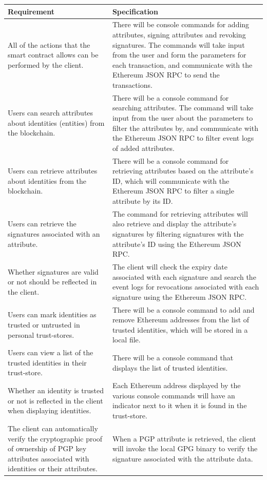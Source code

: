 \documentclass[a4paper]{report}
\begin{document}
	\noindent \begin{longtable}{|p{5.5cm}|p{5.5cm}|}
		\hline
		\textbf{Requirement} & \textbf{Specification} \\ \hline
		All of the actions that the smart contract allows can be performed by the client. & There will be console commands for adding attributes, signing attributes and revoking signatures. The commands will take input from the user and form the parameters for each transaction, and communicate with the Ethereum JSON RPC to send the transactions. \\ \hline
		Users can search attributes about identities (entities) from the blockchain. & There will be a console command for searching attributes. The command will take input from the user about the parameters to filter the attributes by, and communicate with the Ethereum JSON RPC to filter event logs of added attributes. \\ \hline
		Users can retrieve attributes about identities from the blockchain. & There will be a console command for retrieving attributes based on the attribute's ID, which will communicate with the Ethereum JSON RPC to filter a single attribute by its ID. \\ \hline
		Users can retrieve the signatures associated with an attribute. & The command for retrieving attributes will also retrieve and display the attribute's signatures by filtering signatures with the attribute's ID using the Ethereum JSON RPC. \\ \hline
		Whether signatures are valid or not should be reflected in the client. & The client will check the expiry date associated with each signature and search the event logs for revocations associated with each signature using the Ethereum JSON RPC. \\ \hline
		Users can mark identities as trusted or untrusted in personal trust-stores. & There will be a console command to add and remove Ethereum addresses from the list of trusted identities, which will be stored in a local file. \\ \hline
		Users can view a list of the trusted identities in their trust-store. & There will be a console command that displays the list of trusted identities. \\ \hline
		Whether an identity is trusted or not is reflected in the client when displaying identities. & Each Ethereum address displayed by the various console commands will have an indicator next to it when it is found in the trust-store. \\ \hline
		The client can automatically verify the cryptographic proof of ownership of PGP key attributes associated with identities or their attributes. & When a PGP attribute is retrieved, the client will invoke the local GPG binary to verify the signature associated with the attribute data. \\ \hline

\end{longtable}
\end{document}
